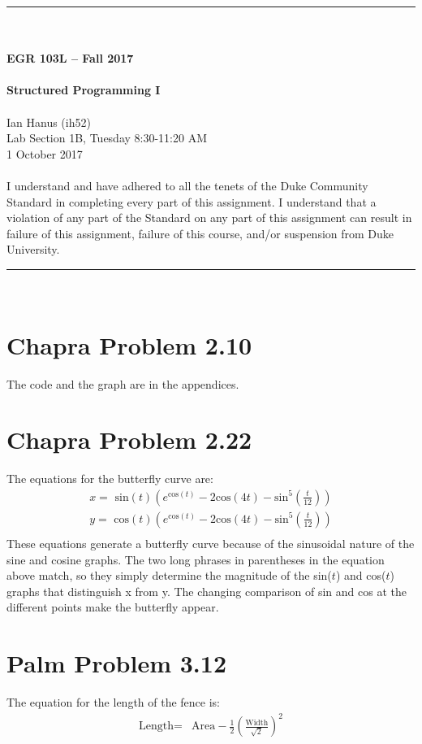 \documentclass{article}
\begin{document}
\begin{center}
\rule{6.5in}{0.5mm}\\~\\
\textbf{\large EGR 103L -- Fall 2017}\\~\\
\textbf{\huge Structured Programming I}\\~\\
Ian Hanus (ih52)\\
Lab Section 1B, Tuesday 8:30-11:20 AM\\
1 October 2017\\~\\
{\small I understand and have adhered to all the tenets of the Duke
  Community Standard in completing every part of this assignment.  I
  understand that a violation of any part of the Standard on any part
  of this assignment can result in failure of this assignment, failure
  of this course, and/or suspension from Duke University.} 
\rule{6.5in}{0.5mm}\\
\end{center}
\tableofcontents
\listoffigures
\pagebreak

\section{Chapra Problem 2.10}
The code and the graph are in the appendices.

\section{Chapra Problem 2.22}
The equations for the butterfly curve\cite[p.~52]{Chapra} are:
\begin{align*}
x = \mbox{ sin}(t)(e^{\mathrm{cos}(t)}-2\mbox{cos}(4t)-\mbox{sin}^5(\frac{t}{12}))\\
y = \mbox{ cos}(t)(e^{\mathrm{cos}(t)}-2\mbox{cos}(4t)-\mbox{sin}^5(\frac{t}{12}))\\
\end{align*}
These equations generate a butterfly curve because of the sinusoidal nature of the sine and cosine graphs. The two long phrases in parentheses in the equation above match, so they simply determine the magnitude of the sin($t$) and cos($t$) graphs that distinguish x from y. The changing comparison of sin and cos at the different points make the butterfly appear.

\section{Palm Problem 3.12}
The equation for the length of the fence is:
\begin{align*}
\mbox{Length} =& \mathrm{Area}-\frac{1}{2}(\frac{\mathrm{Width}}{\sqrt{2}})^2\\
\end{align*}
\end{document}
